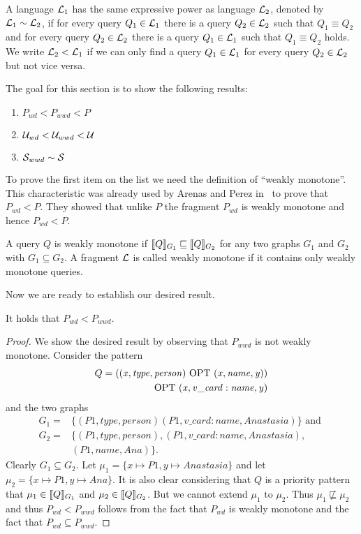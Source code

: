 \begin{definition}
	A language $\mathcal{L}_1$ has the same expressive power as language $\mathcal{L}_2$, denoted by
	$\mathcal{L}_1 \sim \mathcal{L}_2$, if for every query $Q_1 \in \mathcal{L}_1$ there is a query $Q_2 \in
	\mathcal{L}_2$ such that $Q_1 \equiv Q_2$ and for every query $Q_2 \in \mathcal{L}_2$ there is a
	query $Q_1 \in \mathcal{L}_1$ such that $Q_1 \equiv Q_2$ holds. 
	We write $\mathcal{L}_2 < \mathcal{L}_1$ if we can only find a query $Q_1 \in \mathcal{L}_1$ for every
	query $Q_2 \in \mathcal{L}_2$ but not vice versa.
\end{definition}
The goal for this section is to show the following results: 
\begin{enumerate}
	\item $P_{wd} < P_{wwd} <P$
	\item $\mathcal{U}_{wd} < \mathcal{U}_{wwd} < \mathcal{U}$
	\item $\mathcal{S}_{wwd} \sim \mathcal{S}$
\end{enumerate}
To prove the first item on the list we need the definition of ``weakly
monotone''. This characteristic was already used by Arenas and Perez in~\cite{arenas2011querying}
to prove that $P_{wd} < P$. They showed that unlike $P$ the fragment $P_{wd}$ is
weakly monotone and hence $P_{wd} < P$.
\begin{definition}
	A query $Q$ is weakly monotone if $\llbracket Q \rrbracket_{G_1} \sqsubseteq \llbracket Q
	\rrbracket_{G_2}$ for any two graphs $G_1$ and $G_2$ with $G_1 \subseteq G_2$.
	A fragment $\mathcal{L}$ is called weakly monotone if it contains only weakly
	monotone queries.
\end{definition}

Now we are ready to establish our desired result.

\begin{theorem}
	It holds that $P_{wd} < P_{wwd}$.
\end{theorem}
\begin{proof}
	We show the desired result by observing that $P_{wwd}$ is not weakly
	monotone.
	Consider the pattern
	\begin{align*}
		Q=((\mathit{x,type,person)} \mbox{ OPT } \mathit{(x,name,y)})\\
		\mbox{ OPT } \mathit{(x,v\_card:name,y)}
	\end{align*}
	and the two graphs
	\begin{align*}
		G_1 =& \{\mathit{(P1,type,person)} (P1, v\_card:name,Anastasia) \}
		\mbox{ and } \\
		G_2=& \{\mathit{(P1,type,person)}, (P1, v\_card:name,Anastasia),\\
			   &\mathit{(P1, name, Ana)} \}.
	\end{align*}
	Clearly $G_1 \subseteq G_2$. Let $\mu_1 = \{x \mapsto
	P1, y \mapsto Anastasia\}$ and let $\mu_2 = \{x \mapsto
	P1, y \mapsto Ana\}$. It is also clear considering that $Q$ is a priority
	pattern that $\mu_1 \in \llbracket Q \rrbracket_{G_1}$ and  $\mu_2 \in \llbracket Q \rrbracket_{G_2}$. But
	we cannot extend $\mu_1$ to $\mu_2$. Thus $\mu_1 \not\sqsubseteq \mu_2$ and
	thus $P_{wd} < P_{wwd}$ follows from the fact that $P_{wd}$ is weakly
	monotone and the fact that $P_{wd} \subseteq P_{wwd}$.
\end{proof}

